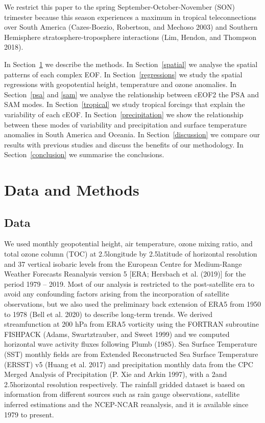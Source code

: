 \documentclass[smallextended]{svjour3}       %
\begin{document}
We restrict this paper to the spring September-October-November (SON) trimester because this season experiences a maximum in tropical teleconnections over South America (Cazes-Boezio, Robertson, and Mechoso 2003) and Southern Hemisphere stratosphere-troposphere interactions (Lim, Hendon, and Thompson 2018).

In Section~\ref{methods} we describe the methods.
In Section~\ref{spatial} we analyse the spatial patterns of each complex EOF.
In Section~\ref{regressions} we study the spatial regressions with geopotential height, temperature and ozone anomalies.
In Section~\ref{psa} and \ref{sam} we analyse the relationship between cEOF2 the PSA and SAM modes.
In Section~\ref{tropical} we study tropical forcings that explain the variability of each cEOF.
In Section~\ref{precipitation} we show the relationship between these modes of variability and precipitation and surface temperature anomalies in South America and Oceania.
In Section~\ref{discussion} we compare our results with previous studies and discuss the benefits of our methodology.
In Section~\ref{conclusion} we summarise the conclusions.

\hypertarget{methods}{%
\section{Data and Methods}\label{methods}}

\hypertarget{data}{%
\subsection{Data}\label{data}}

We used monthly geopotential height, air temperature, ozone mixing ratio, and total ozone column (TOC) at 2.5\degree longitude by 2.5\degree latitude of horizontal resolution and 37 vertical isobaric levels from the European Centre for Medium-Range Weather Forecasts Reanalysis version 5 {[}ERA; Hersbach et al. (2019){]} for the period 1979 -- 2019.
Most of our analysis is restricted to the post-satellite era to avoid any confounding factors arising from the incorporation of satellite observations, but we also used the preliminary back extension of ERA5 from 1950 to 1978 (Bell et al. 2020) to describe long-term trends.
We derived streamfunction at 200 hPa from ERA5 vorticity using the FORTRAN subroutine FISHPACK (Adams, Swartztrauber, and Sweet 1999) and we computed horizontal wave activity fluxes following Plumb (1985).
Sea Surface Temperature (SST) monthly fields are from Extended Reconstructed Sea Surface Temperature (ERSST) v5 (Huang et al. 2017) and precipitation monthly data from the CPC Merged Analysis of Precipitation (P. Xie and Arkin 1997), with a 2\degree and 2.5\degree horizontal resolution respectively.
The rainfall gridded dataset is based on information from different sources such as rain gauge observations, satellite inferred estimations and the NCEP-NCAR reanalysis, and it is available since 1979 to present.
\end{document}
